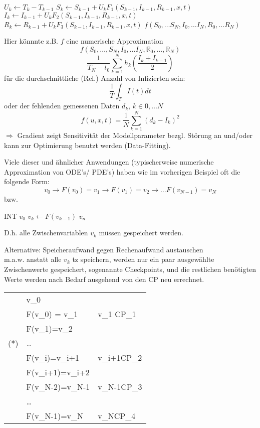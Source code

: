 \begin{algorithmic}
		\State $U_k \gets T_k-T_{k-1}$
		\State $S_k \gets S_{k-1} + U_kF_1(S_{k-1},I_{k-1},R_{k-1},x,t)$
		\State $I_k \gets I_{k-1} + U_kF_2(S_{k-1},I_{k-1},R_{k-1},x,t)$
		\State $R_k \gets R_{k-1} + U_kF_3(S_{k-1},I_{k-1},R_{k-1},x,t)$
	\EndFor
	\State \Return $f(S_0,\dots S_N,I_0,\dots I_N, R_0,\dots R_N)$
\end{algorithmic}

Hier könnnte z.B. $f$ eine numerische Approximation
$$f(S_0,\dots,S_N,I_0,\dots I_N,\mathbb{R}_0,\dots,\mathbb{R}_N)$$
$$ \frac{1}{T_N-t_0}\sum_{k=1}^N h_k(\frac{I_k+I_{k-1}}{2})$$
für die durchschnittliche (Rel.) Anzahl von Infizierten sein:
$$\frac{1}{T}\int_TI(t)dt$$
oder der fehlenden gemessenen Daten $d_{k}$, $k \in 0,\dots N$
$$f(u,x,t) = \frac{1}{N}\sum_{k=1}^N(d_k-I_k)^2$$
$\Rightarrow$ Gradient zeigt Sensitivität der Modellparameter bezgl. Störung an und/oder kann zur Optimierung benutzt werden (Data-Fitting).

\noindent\makebox[\linewidth]{\rule{\paperwidth}{0.4pt}}
Viele dieser und ähnlicher Anwendungen (typischerweise numerische Approximation von ODE's/ PDE's) haben wie im vorherigen Beispiel oft die folgende Form:
$$v_0 \rightarrow F(v_0) = v_1 \rightarrow F(v_1)=v_2 \rightarrow \dots F(v_{N-1})=v_N$$
bzw.
\begin{algorithmic}
	\State INT $v_0$
		\State $v_k \gets F(v_{k-1})$
	\EndFor
	\State \Return $v_n$
\end{algorithmic}

D.h. alle Zwischenvariablen $v_k$ müssen gespeichert werden.

Alternative: \glqq Speicheraufwand gegen Rechenaufwand austauschen \grqq\\
m.a.w. anstatt alle $v_k$ tz speichern, werden nur ein paar ausgewählte Zwischenwerte gespeichert, sogenannte Checkpoints, und die restlichen benötigten Werte werden nach Bedarf ausgehend von den CP neu errechnet.

\begin{tabular}{L L | L}
	&v_0 &\\
	&\rightarrow F(v_0) = v_1 &v_1 \hat{=}CP_1\\
	&\rightarrow F(v_1)=v_2 &\\
	(*)&\rightarrow \dots &\\
	&\rightarrow F(v_i)=v_{i+1} &v_{i+1}\hat{=}CP_2\\
	&\rightarrow F(v_{i+1})=v_{i+2} &\\
	&\rightarrow F(v_{N-2})=v_{N-1}&v_{N-1}\hat{=}CP_3\\
	&\rightarrow \dots &\\
	&\rightarrow F(v_{N-1})=v_N& v_N\hat{=}CP_4
\end{tabular}
\newpage
